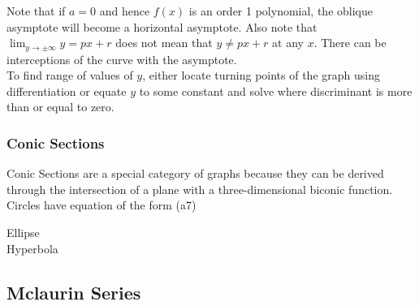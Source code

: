 \documentclass[../main]{subfiles}
\begin{document}
	Note that if \(a=0\) and hence \(f(x)\) is an order 1 polynomial, the oblique asymptote will become a horizontal asymptote. Also note that \(\lim_{y\to\pm\infty} y = px+r\) does not mean that \(y \neq px + r\) at any \(x\). There can be interceptions of the curve with the asymptote. \\

	To find range of values of \(y\), either locate turning points of the graph using differentiation or equate \(y\) to some constant and solve where discriminant is more than or equal to zero.

	\subsubsection{Conic Sections}

	Conic Sections are a special category of graphs because they can be derived through the intersection of a plane with a three-dimensional biconic function. \\

	Circles have equation of the form (a7)

	Ellipse \\

	Hyperbola \\

\subsection{Mclaurin Series}
\end{document}
